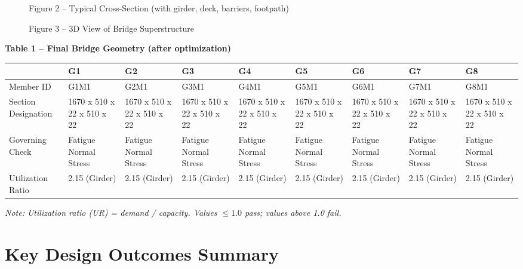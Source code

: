 \documentclass[12pt,a4paper]{report}
\numberwithin{table}{chapter}
\numberwithin{figure}{chapter}
\begin{document}
\newpage

\begin{figure}[H]
\centering
{}
\caption*{Figure 2 -- Typical Cross-Section (with girder, deck, barriers, footpath)}
\end{figure}

\begin{figure}[H]
\centering
{}
\caption*{Figure 3 -- 3D View of Bridge Superstructure}
\end{figure}

\noindent\textbf{Table 1 -- Final Bridge Geometry (after optimization)}

\vspace{0.4em}
\noindent
\begin{tabular}{|C{2.8cm}|C{1.5cm}|C{1.5cm}|C{1.5cm}|C{1.5cm}|C{1.5cm}|C{1.5cm}|C{1.5cm}|C{1.5cm}|}
\hline
  \textbf{} &
  \textbf{G1} &
  \textbf{G2} &
  \textbf{G3} &
  \textbf{G4} &
  \textbf{G5} &
  \textbf{G6} &
  \textbf{G7} &
  \textbf{G8} \\
\hline
Member ID & G1M1 & G2M1 & G3M1 & G4M1 & G5M1 & G6M1 & G7M1 & G8M1 \\
\hline
Section Designation & 1670 x 510 x 22 x 510 x 22 & 1670 x 510 x 22 x 510 x 22 & 1670 x 510 x 22 x 510 x 22 & 1670 x 510 x 22 x 510 x 22 & 1670 x 510 x 22 x 510 x 22 & 1670 x 510 x 22 x 510 x 22 & 1670 x 510 x 22 x 510 x 22 & 1670 x 510 x 22 x 510 x 22 \\
\hline
Governing Check & Fatigue Normal Stress & Fatigue Normal Stress & Fatigue Normal Stress & Fatigue Normal Stress & Fatigue Normal Stress & Fatigue Normal Stress & Fatigue Normal Stress & Fatigue Normal Stress \\
\hline
Utilization Ratio & 2.15 (Girder) & 2.15 (Girder) & 2.15 (Girder) & 2.15 (Girder) & 2.15 (Girder) & 2.15 (Girder) & 2.15 (Girder) & 2.15 (Girder) \\
\hline
\end{tabular}

\vspace{0.4em}
\noindent\textit{Note: Utilization ratio (UR) = demand / capacity. Values $\leq 1.0$ pass; values above 1.0 fail.}

\vspace{1em}

\section*{Key Design Outcomes Summary}
\label{sec:key-outcomes}
\end{document}
